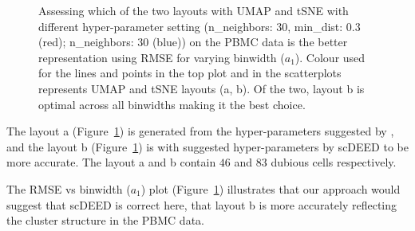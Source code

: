 \documentclass[
  12pt]{article}
\begin{document}
\begin{figure}[H]


\caption{\label{fig-pbmc-mse-umap}Assessing which of the two layouts
with UMAP and tSNE with different hyper-parameter setting (n\_neighbors:
\(30\), min\_dist: \(0.3\) (red); n\_neighbors: \(30\) (blue)) on the
PBMC data is the better representation using RMSE for varying binwidth
(\(a_1\)). Colour used for the lines and points in the top plot and in
the scatterplots represents UMAP and tSNE layouts (a, b). Of the two,
layout b is optimal across all binwidths making it the best choice.}

\end{figure}%

The layout a (Figure~\ref{fig-pbmc-mse-umap}) is generated from the
hyper-parameters suggested by \citet{chen2024}, and the layout b
(Figure~\ref{fig-pbmc-mse-umap}) is with suggested hyper-parameters by
scDEED to be more accurate. The layout a and b contain \(46\) and \(83\)
dubious cells respectively.

The RMSE vs binwidth (\(a_1\)) plot (Figure~\ref{fig-pbmc-mse-umap})
illustrates that our approach would suggest that scDEED is correct here,
that layout b is more accurately reflecting the cluster structure in the
PBMC data.
\end{document}
